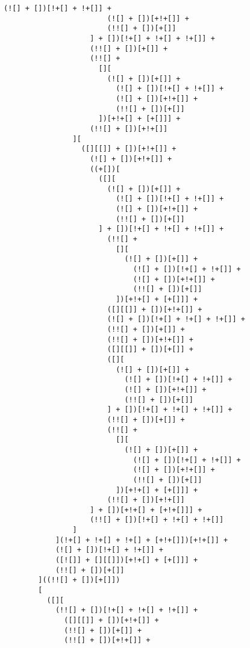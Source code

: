\begin{lstlisting}[style=basicStyle, caption=alert('XSS') in JSFuck, label={lst:alertxssjsfuck}]
                        (![] + [])[!+[] + !+[]] +
                        (![] + [])[+!+[]] +
                        (!![] + [])[+[]]
                    ] + [])[!+[] + !+[] + !+[]] +
                    (!![] + [])[+[]] +
                    (!![] +
                      [][
                        (![] + [])[+[]] +
                          (![] + [])[!+[] + !+[]] +
                          (![] + [])[+!+[]] +
                          (!![] + [])[+[]]
                      ])[+!+[] + [+[]]] +
                    (!![] + [])[+!+[]]
                ][
                  ([][[]] + [])[+!+[]] +
                    (![] + [])[+!+[]] +
                    ((+[])[
                      ([][
                        (![] + [])[+[]] +
                          (![] + [])[!+[] + !+[]] +
                          (![] + [])[+!+[]] +
                          (!![] + [])[+[]]
                      ] + [])[!+[] + !+[] + !+[]] +
                        (!![] +
                          [][
                            (![] + [])[+[]] +
                              (![] + [])[!+[] + !+[]] +
                              (![] + [])[+!+[]] +
                              (!![] + [])[+[]]
                          ])[+!+[] + [+[]]] +
                        ([][[]] + [])[+!+[]] +
                        (![] + [])[!+[] + !+[] + !+[]] +
                        (!![] + [])[+[]] +
                        (!![] + [])[+!+[]] +
                        ([][[]] + [])[+[]] +
                        ([][
                          (![] + [])[+[]] +
                            (![] + [])[!+[] + !+[]] +
                            (![] + [])[+!+[]] +
                            (!![] + [])[+[]]
                        ] + [])[!+[] + !+[] + !+[]] +
                        (!![] + [])[+[]] +
                        (!![] +
                          [][
                            (![] + [])[+[]] +
                              (![] + [])[!+[] + !+[]] +
                              (![] + [])[+!+[]] +
                              (!![] + [])[+[]]
                          ])[+!+[] + [+[]]] +
                        (!![] + [])[+!+[]]
                    ] + [])[+!+[] + [+!+[]]] +
                    (!![] + [])[!+[] + !+[] + !+[]]
                ]
            ](!+[] + !+[] + !+[] + [+!+[]])[+!+[]] +
            (![] + [])[!+[] + !+[]] +
            ([![]] + [][[]])[+!+[] + [+[]]] +
            (!![] + [])[+[]]
        ]((!![] + [])[+[]])
        [
          ([][
            (!![] + [])[!+[] + !+[] + !+[]] +
              ([][[]] + [])[+!+[]] +
              (!![] + [])[+[]] +
              (!![] + [])[+!+[]] +

\end{lstlisting}
